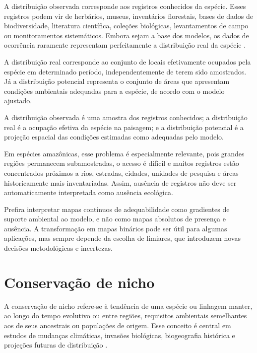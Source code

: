 A distribuição observada corresponde aos registros conhecidos da espécie. Esses registros podem vir de herbários, museus, inventários florestais, bases de dados de biodiversidade, literatura científica, coleções biológicas, levantamentos de campo ou monitoramentos sistemáticos. Embora sejam a base dos modelos, os dados de ocorrência raramente representam perfeitamente a distribuição real da espécie \parencite{hijmans2021,guisan2017habitat}.

A distribuição real corresponde ao conjunto de locais efetivamente ocupados pela espécie em determinado período, independentemente de terem sido amostrados. Já a distribuição potencial representa o conjunto de áreas que apresentam condições ambientais adequadas para a espécie, de acordo com o modelo ajustado.

\begin{conceito}
A distribuição observada é uma amostra dos registros conhecidos; a distribuição real é a ocupação efetiva da espécie na paisagem; e a distribuição potencial é a projeção espacial das condições estimadas como adequadas pelo modelo.
\end{conceito}

Em espécies amazônicas, esse problema é especialmente relevante, pois grandes regiões permanecem subamostradas, o acesso é difícil e muitos registros estão concentrados próximos a rios, estradas, cidades, unidades de pesquisa e áreas historicamente mais inventariadas. Assim, ausência de registros não deve ser automaticamente interpretada como ausência ecológica.

\begin{dica}
Prefira interpretar mapas contínuos de adequabilidade como gradientes de suporte ambiental ao modelo, e não como mapas absolutos de presença e ausência. A transformação em mapas binários pode ser útil para algumas aplicações, mas sempre depende da escolha de limiares, que introduzem novas decisões metodológicas e incertezas.
\end{dica}

\section{Conservação de nicho}

A conservação de nicho refere-se à tendência de uma espécie ou linhagem manter, ao longo do tempo evolutivo ou entre regiões, requisitos ambientais semelhantes aos de seus ancestrais ou populações de origem. Esse conceito é central em estudos de mudanças climáticas, invasões biológicas, biogeografia histórica e projeções futuras de distribuição \parencite{peterson2011,guisan2017habitat,raes2018modeling}.

